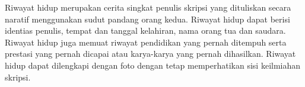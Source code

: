 \begin{riwayathidup}
Riwayat hidup merupakan cerita singkat penulis skripsi yang dituliskan secara naratif menggunakan sudut pandang orang kedua. Riwayat hidup dapat berisi identias penulis, tempat dan tanggal kelahiran, nama orang tua dan saudara. Riwayat hidup juga memuat riwayat pendidikan yang pernah ditempuh serta prestasi yang pernah dicapai atau karya-karya yang pernah dihasilkan. Riwayat hidup dapat dilengkapi dengan foto dengan tetap memperhatikan sisi keilmiahan skripsi.
\end{riwayathidup}